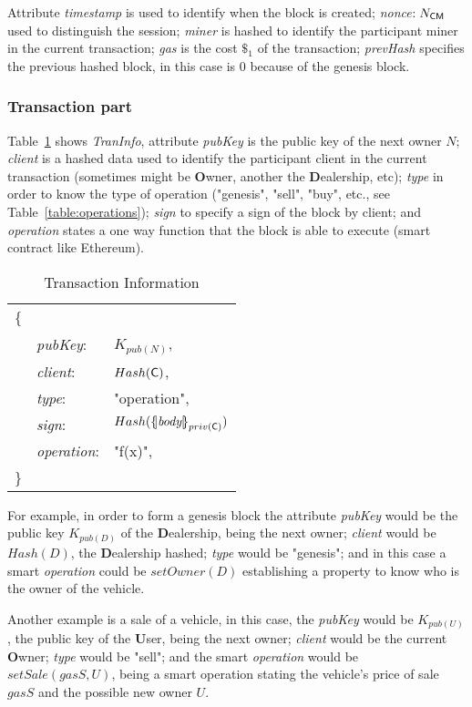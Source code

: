 Attribute \textit{timestamp} is used to identify when the block is created; 
\textit{nonce}$:N_{\textsf{C}\textsf{M}}$ used to distinguish the session; 
\textit{miner} is hashed to identify the participant miner in the current 
transaction;
\textit{gas} is the cost $\$_1$ of the transaction;
\textit{prevHash} specifies the previous hashed block, in this case is 0 because of the 
genesis block.

\subsubsection{Transaction part}
Table~\ref{table:TranBlockInfo} shows \textit{TranInfo}, attribute \textit{pubKey} 
is the public key of the next owner $N$; 
\textit{client} is a hashed data used to identify the participant client in the current 
transaction (sometimes might be \textbf{O}wner, another the \textbf{D}ealership, etc); 
\textit{type} in order to know the type of operation ("genesis", "sell", "buy", etc., see Table~\ref{table:operations}); 
\textit{sign} to specify a sign of the block by client; and 
\textit{operation} states a one way function that the block is able to execute (smart contract like Ethereum). 
\begin{table}[h]
    \centering
    \caption{Transaction Information}
        \begin{tabular}{lll}
            \{  &               &    \\
                & \textit{pubKey}:       & $K_{pub(N)}$, \\
                & \textit{client}:       & $Hash(\textsf{C})$, \\
                & \textit{type}:         & "operation", \\
                & \textit{sign}:         & $Hash(\fat{\textit{body}}_{priv(\Client)})$ \\
                & \textit{operation}:    & "f(x)", \\
            \}  &               &   \\
        \end{tabular}
    \label{table:TranBlockInfo}
\end{table}

For example, in order to form a genesis block the attribute \textit{pubKey} would be the 
public key $K_{pub(D)}$ of the \textbf{D}ealership, being 
the next owner; 
\textit{client} would be $Hash(D)$, the \textbf{D}ealership hashed; 
\textit{type} would be "genesis"; and in this case a 
smart \textit{operation} could be $setOwner(D)$ establishing a property to know who is the
owner of the vehicle.

Another example is a sale of a vehicle, in this case, the \textit{pubKey} 
would be $K_{pub(U)}$, the public key of the \textbf{U}ser, being the next owner; 
\textit{client} would be the current \textbf{O}wner; 
\textit{type} would be "sell"; 
and the smart \textit{operation} would be $setSale(\textit{gasS}, U)$, being a smart operation
stating the vehicle's price of sale $gasS$ and the possible new owner $U$.